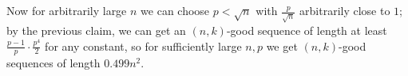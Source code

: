\documentclass[11pt]{scrartcl}
\begin{document}
Now for arbitrarily large $n$ we can choose $p<\sqrt{n}$ with $\frac{p}{\sqrt{n}}$ arbitrarily close to $1$; by the previous claim, we can get an $(n,k)$-good sequence of length at least $\frac{p-1}{p} \cdot \frac{p^4}{2}$ for any constant, so for sufficiently large $n,p$ we get $(n,k)$-good sequences of length $0.499n^2$.
\pagebreak
\end{document}
